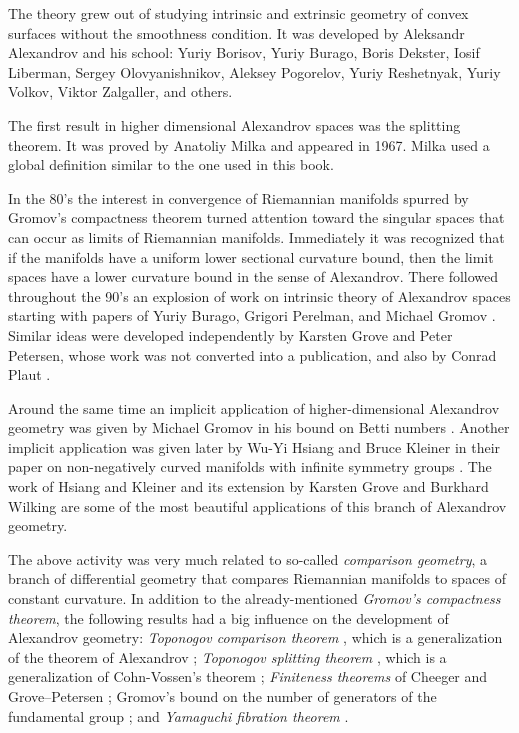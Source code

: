 The theory grew out of studying intrinsic and extrinsic geometry of convex surfaces without the smoothness condition.
It was developed by Aleksandr Alexandrov
and his school:
Yuriy  Borisov,
Yuriy  Burago,
Boris Dekster,
Iosif  Liberman,
Sergey  Olovyanishnikov,
Aleksey  Pogorelov,
Yuriy  Reshetnyak,
Yuriy  Volkov,
Viktor  Zalgaller,
and others.

The first result in higher dimensional Alexandrov spaces was the splitting theorem.
It was proved by Anatoliy Milka \cite{milka-line} and appeared in 1967.
Milka used a global definition similar to the one used in this book. %

In the 80's the interest in convergence of Riemannian manifolds spurred by Gromov's compactness theorem \cite{gromov-MS} turned attention toward the singular spaces that can occur as limits of Riemannian manifolds.
Immediately it was recognized that if the manifolds have a uniform lower sectional curvature bound, then the limit spaces have a lower curvature bound in the sense of Alexandrov. 
There followed throughout the 90's an explosion of work on intrinsic theory of Alexandrov spaces starting with papers of Yuriy Burago, Grigori Perelman, and Michael Gromov  \cite{burago-gromov-perelman,perelman:spaces2}.
Similar ideas were developed independently by Karsten Grove
and Peter Petersen, whose work was not converted into a publication, and also by
Conrad Plaut \cite{plaut-preprint}.

Around the same time an implicit application of higher-dimensional Alexandrov geometry was given by Michael Gromov in his bound on Betti numbers \cite{gromov:betti}.
Another implicit application was given later by Wu-Yi Hsiang and Bruce Kleiner in their paper on non-negatively curved manifolds with infinite symmetry groups \cite{hsiang-kleiner}.
The work of Hsiang and Kleiner and its extension by Karsten Grove and Burkhard Wilking \cite{grove-wilking} are some of the most beautiful applications of this branch of Alexandrov geometry.

The above activity was very much related to so-called {}\emph{comparison geometry},
a branch of differential geometry that compares Riemannian manifolds  to  spaces of constant curvature.
In addition to the already-mentioned {}\emph{Gromov's compactness theorem},
the following results had a big influence on the development of Alexandrov geometry:
{}\emph{Toponogov comparison theorem} \cite{toponogov-globalization+splitting}, which is a generalization of the theorem of Alexandrov \cite{alexandrov-comparison};
{}\emph{Toponogov splitting theorem} \cite{toponogov-globalization+splitting}, which is a generalization of Cohn-Vossen's theorem \cite{cohn-vossen_line};
{}\emph{Finiteness theorems} of
Cheeger
and
Grove--Petersen \cite{cheeger-finiteness,grove-petersen:finiteness};
Gromov's bound on the number of generators of the fundamental group 
\cite[1.5]{gromov:almost-flat};
and 
{}\emph{Yamaguchi fibration theorem} \cite{yamaguchi-fibration}.

